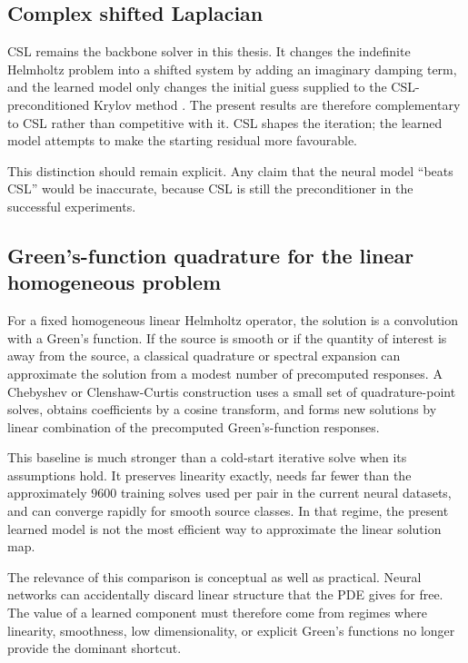 \subsection{Complex shifted Laplacian}
\label{subsec:discussion-csl}

CSL remains the backbone solver in this thesis. It changes the indefinite
Helmholtz problem into a shifted system by adding an imaginary damping term,
and the learned model only changes the initial guess supplied to the
CSL-preconditioned Krylov method \cite{Erlangga2004}. The present results are
therefore complementary to CSL rather than competitive with it. CSL shapes the
iteration; the learned model attempts to make the starting residual more
favourable.

This distinction should remain explicit. Any claim that the neural model
``beats CSL'' would be inaccurate, because CSL is still the preconditioner in
the successful experiments.

\subsection{Green's-function quadrature for the linear homogeneous problem}
\label{subsec:discussion-greens-quadrature}

For a fixed homogeneous linear Helmholtz operator, the solution is a
convolution with a Green's function. If the source is smooth or if the quantity
of interest is away from the source, a classical quadrature or spectral
expansion can approximate the solution from a modest number of precomputed
responses. A Chebyshev or Clenshaw-Curtis construction uses a small set of
quadrature-point solves, obtains coefficients by a cosine transform, and
forms new solutions by linear combination of the precomputed Green's-function
responses.

This baseline is much stronger than a cold-start iterative solve when its
assumptions hold. It preserves linearity exactly, needs far fewer than the
approximately $9600$ training solves used per pair in the current neural
datasets, and can converge rapidly for smooth source classes. In that regime,
the present learned model is not the most efficient way to approximate the
linear solution map.

The relevance of this comparison is conceptual as well as practical. Neural
networks can accidentally discard linear structure that the PDE gives for
free. The value of a learned component must therefore come from regimes where
linearity, smoothness, low dimensionality, or explicit Green's functions no
longer provide the dominant shortcut.

